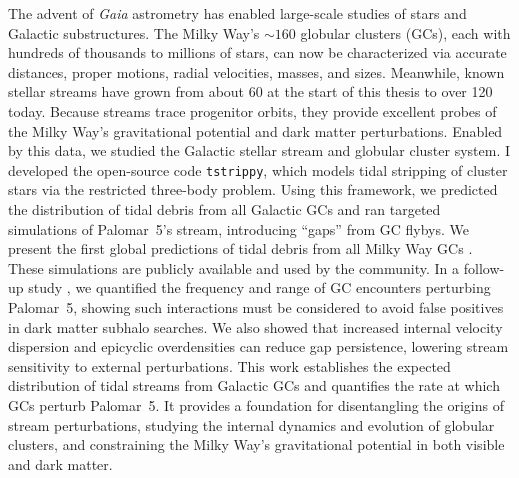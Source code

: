 The advent of \textit{Gaia} astrometry has enabled large-scale studies of stars and Galactic substructures. The Milky Way's $\sim 160$ globular clusters (GCs), each with hundreds of thousands to millions of stars, can now be characterized via accurate distances, proper motions, radial velocities, masses, and sizes. Meanwhile, known stellar streams have grown from about 60 at the start of this thesis to over 120 today. Because streams trace progenitor orbits, they provide excellent probes of the Milky Way's gravitational potential and dark matter perturbations. Enabled by this data, we studied the Galactic stellar stream and globular cluster system. I developed the open-source code \texttt{tstrippy}, which models tidal stripping of cluster stars via the restricted three-body problem. Using this framework, we predicted the distribution of tidal debris from all Galactic GCs and ran targeted simulations of Palomar~5's stream, introducing ``gaps'' from GC flybys. We present the first global predictions of tidal debris from all Milky Way GCs \citep{2023A&A...673A..44F}. These simulations are publicly available and used by the community. In a follow-up study \citep{2025A&A...699A.289F}, we quantified the frequency and range of GC encounters perturbing Palomar~5, showing such interactions must be considered to avoid false positives in dark matter subhalo searches. We also showed that increased internal velocity dispersion and epicyclic overdensities can reduce gap persistence, lowering stream sensitivity to external perturbations. This work establishes the expected distribution of tidal streams from Galactic GCs and quantifies the rate at which GCs perturb Palomar~5. It provides a foundation for disentangling the origins of stream perturbations, studying the internal dynamics and evolution of globular clusters, and constraining the Milky Way's gravitational potential in both visible and dark matter.

